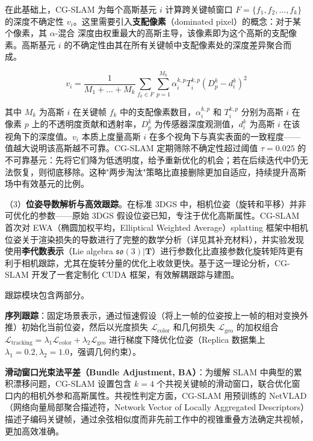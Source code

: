 在此基础上，CG-SLAM 为每个高斯基元 $i$ 计算跨关键帧窗口 $F = \{f_1, f_2, ..., f_k\}$ 的深度不确定性 $v_i$。这里需要引入\textbf{支配像素}（dominated pixel）的概念：对于某个像素，其 $\alpha$-混合 深度由权重最大的高斯主导，该像素即为这个高斯的支配像素。高斯基元 $i$ 的不确定性由其在所有关键帧中支配像素处的深度差异聚合而成。

\begin{equation}
    v_i = \frac{1}{M_1 + ... + M_k} \sum_{f_k \in F} \sum_{p=1}^{M_k} \alpha_i^{k,p} T_i^{k,p} (D_p^k - d_i^k)^2
\end{equation}

其中 $M_k$ 为高斯 $i$ 在关键帧 $f_k$ 中的支配像素数目，$\alpha_i^{k,p}$ 和 $T_i^{k,p}$ 分别为高斯 $i$ 在像素 $p$ 上的不透明度贡献和透射率，$D_p^k$ 为传感器深度观测值，$d_i^k$ 为高斯 $i$ 在该视角下的深度值。$v_i$ 本质上度量高斯 $i$ 在多个视角下与真实表面的一致程度——值越大说明该高斯越不可靠。CG-SLAM 定期筛除不确定性超过阈值 $\tau=0.025$ 的不可靠基元：先将它们降为低透明度，给予重新优化的机会；若在后续迭代中仍无法恢复，则彻底移除。这种"两步淘汰"策略比直接删除更加自适应，持续提升高斯场中有效基元的比例。

（3）\textbf{位姿导数解析与高效跟踪}。在标准 3DGS 中，相机位姿（旋转和平移）并非可优化的参数——原始 3DGS 假设位姿已知，专注于优化高斯属性。CG-SLAM 首次对 EWA（椭圆加权平均，Elliptical Weighted Average）splatting 框架中相机位姿关于渲染损失的导数进行了完整的数学分析（详见其补充材料），并实验发现使用\textbf{李代数表示}（Lie algebra $\mathfrak{so}(3) | \mathbf{T}$）进行参数化比直接参数化旋转矩阵更有利于相机跟踪，尤其在旋转分量的优化上收敛更快。基于这一理论分析，CG-SLAM 开发了一套定制化 CUDA 框架，有效解耦跟踪与建图。

跟踪模块包含两部分。

\textbf{序列跟踪}：固定场景表示，通过恒速假设（将上一帧的位姿按上一帧的相对变换外推）初始化当前位姿，然后以光度损失 $\mathcal{L}_\text{color}$ 和几何损失 $\mathcal{L}_\text{geo}$ 的加权组合 $\mathcal{L}_\text{tracking} = \lambda_1 \mathcal{L}_\text{color} + \lambda_2 \mathcal{L}_\text{geo}$ 进行梯度下降优化位姿（Replica 数据集上 $\lambda_1=0.2, \lambda_2=1.0$，强调几何约束）。

\textbf{滑动窗口光束法平差（Bundle Adjustment, BA）}：为缓解 SLAM 中典型的累积漂移问题，CG-SLAM 设置包含 $k=4$ 个共视关键帧的滑动窗口，联合优化窗口内的相机外参和高斯属性。共视性判定方面，CG-SLAM 用预训练的 NetVLAD（网络向量局部聚合描述符，Network Vector of Locally Aggregated Descriptors）描述子编码关键帧，通过余弦相似度而非先前工作中的视锥重叠方法确定共视帧，更加高效准确。

